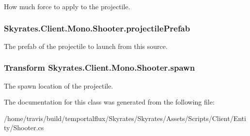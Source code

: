 How much force to apply to the projectile. 

\hypertarget{class_skyrates_1_1_client_1_1_mono_1_1_shooter_a33a43f93da1a0b19f25a6fbe91ed4dd3}{
\subsubsection[{projectile\-Prefab}]{ Skyrates.\-Client.\-Mono.\-Shooter.\-projectile\-Prefab}}\label{class_skyrates_1_1_client_1_1_mono_1_1_shooter_a33a43f93da1a0b19f25a6fbe91ed4dd3}


The prefab of the projectile to launch from this source. 

\hypertarget{class_skyrates_1_1_client_1_1_mono_1_1_shooter_a2aeb7c35dc048f65e02ccecfc654ab2c}{
\subsubsection[{spawn}]{\setlength{\rightskip}{0pt plus 5cm}Transform Skyrates.\-Client.\-Mono.\-Shooter.\-spawn}}\label{class_skyrates_1_1_client_1_1_mono_1_1_shooter_a2aeb7c35dc048f65e02ccecfc654ab2c}


The spawn location of the projectile. 



The documentation for this class was generated from the following file\-:\begin{DoxyCompactItemize}
\item 
/home/travis/build/temportalflux/\-Skyrates/\-Skyrates/\-Assets/\-Scripts/\-Client/\-Entity/Shooter.\-cs\end{DoxyCompactItemize}

